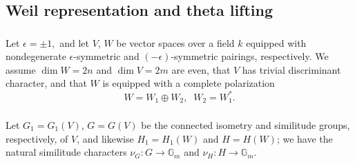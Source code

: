 \documentclass[12pt]{amsart}
\theoremstyle{definition}
\begin{document}
\subsection{Weil representation and theta lifting}\label{appendix subsection theta lifting}
\subsubsection{}\label{appendix bilinear forms subsubsec}
Let $\epsilon =\pm 1, $ and let $V$, $W$ be vector spaces over  a field $k$ equipped with nondegenerate $\epsilon$-symmetric and $(-\epsilon)$-symmetric pairings, respectively. We assume $\dim W = 2n $ and $\dim V = 2m $ are even, that $V$ has trivial discriminant character, and that $W$ is equipped with a complete polarization \begin{equation}
    W = W_1\oplus W_2,\;\; W_2 = W_1 ^\ast.
\end{equation}
\subsubsection{}
Let  $G_1 = G_1 (V) $, $G=G (V) $ be the connected isometry and similitude groups, respectively, of $V$, and likewise $H_1 = H _1(W) $ and $H = H (W) $; we have the natural similitude characters $\nu_G: G \to \mathbb G_m$ and $\nu_H: H \to \mathbb G_m$. 
\end{document}
